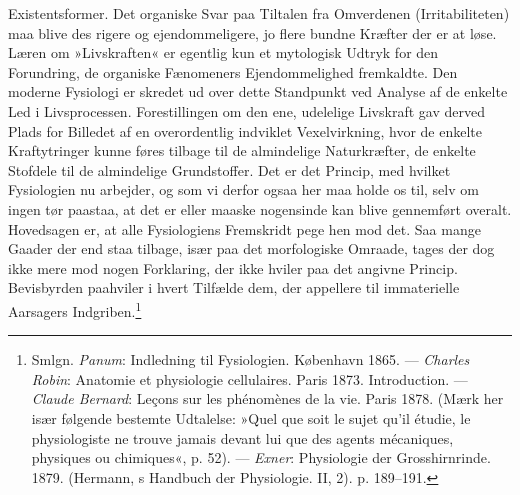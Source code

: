 \documentclass[12pt,a4paper,openany]{book}
\newcommand{\opage}[1]{\marginnote{\footnotesize\textit{[#1]}}}
\begin{document}
Existentsformer. Det organiske Svar paa Tiltalen fra Omverdenen
(Irritabiliteten) maa blive des rigere og ejendommeligere, jo flere
bundne Kræfter der er at løse. Læren om »Livskraften« er egentlig kun et
mytologisk Udtryk for den Forundring, de organiske Fænomeners
Ejendommelighed fremkaldte. Den moderne Fysiologi er skredet ud over
dette Standpunkt ved Analyse af de enkelte Led i Livsprocessen.
Forestillingen om den ene, udelelige Livskraft gav derved Plads for
Billedet af en overordentlig indviklet Vexelvirkning, hvor de enkelte
Kraftytringer kunne føres tilbage til de almindelige Naturkræfter, de
enkelte Stofdele til de almindelige Grundstoffer. Det er det Princip,
med hvilket Fysiologien nu arbejder, og som vi derfor ogsaa her maa
holde os til, selv om ingen tør paastaa, at det er eller maaske
nogensinde kan blive gennemført overalt. Hovedsagen er, at alle
Fysiologiens Fremskridt pege hen mod det. Saa mange Gaader der end staa
\opage{42}tilbage, især paa det morfologiske Omraade, tages der dog ikke
mere mod nogen Forklaring, der ikke hviler paa det angivne Princip.
Bevisbyrden paahviler i hvert Tilfælde dem, der appellere til
immaterielle Aarsagers Indgriben.\footnote[1]{Smlgn. \emph{Panum}:
Indledning til Fysiologien. København 1865. --- \emph{Charles Robin}:
Anatomie et physiologie cellulaires. Paris 1873. Introduction. ---
\emph{Claude Bernard}: Leçons sur les phénomènes de la vie. Paris 1878.
(Mærk her især følgende bestemte Udtalelse: »Quel que soit le sujet
qu’il étudie, le physiologiste ne trouve jamais devant lui que des
agents mécaniques, physiques ou chimiques«, p. 52). --- \emph{Exner}:
Physiologie der Grosshirnrinde. 1879. (Hermann, s Handbuch der
Physiologie. II, 2). p. 189--191.}
\end{document}
